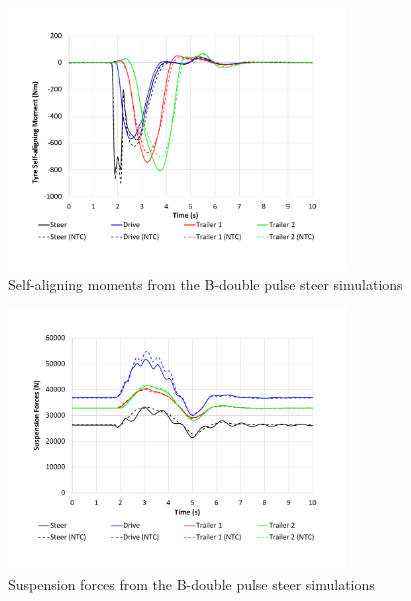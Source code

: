     \begin{figure}[H]
        \centering
        \includegraphics[width=0.8\textwidth]{fig/ntc-b-double_pse}
        \caption{Self-aligning moments from the B-double pulse steer simulations}
        \label{figure:ntc-b-double_pse}
    \end{figure}

    \begin{figure}[H]
        \centering
        \includegraphics[width=0.8\textwidth]{fig/ntc-b-double_psf}
        \caption{Suspension forces from the B-double pulse steer simulations}
        \label{figure:ntc-b-double_psf}
    \end{figure}

